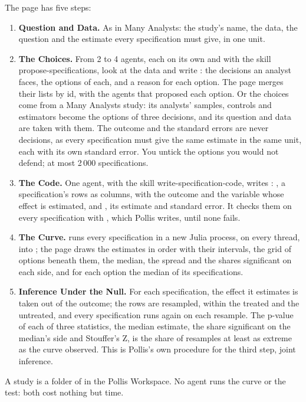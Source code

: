 The page has five steps:
\begin{enumerate}
  \item \textbf{Question and Data.} As in Many Analysts: the study's name, the data, the question and the
    estimate every specification must give, in one unit.
  \item \textbf{The Choices.} From 2 to 4 agents, each on its own and with the skill propose-specifications, look
    at the data and write : the decisions an analyst faces, the options of each, and a reason
    for each option. The page merges their lists by id, with the agents that proposed each option. Or the choices
    come from a Many Analysts study: its analysts' samples, controls and estimators become the options of three
    decisions, and its question and data are taken with them. The outcome and the standard errors are never
    decisions, as every specification must give the same estimate in the same unit, each with its own standard
    error. You untick the options you would not defend; at most 2\,000 specifications.
  \item \textbf{The Code.} One agent, with the skill write-specification-code, writes :
    , a specification's rows as columns, with the outcome  and the variable
     whose effect is estimated, and , its estimate and standard error. It checks
    them on every specification with , which Pollis writes, until none fails.
  \item \textbf{The Curve.}  runs every specification in a new Julia process, on every thread, into
    ; the page draws the estimates in order with their intervals, the grid of options beneath them,
    the median, the spread and the shares significant on each side, and for each option the median of its
    specifications.
  \item \textbf{Inference Under the Null.} For each specification, the effect it estimates is taken out of the
    outcome; the rows are resampled, within the treated and the untreated, and every specification runs again on
    each resample. The p-value of each of three statistics, the median estimate, the share significant on the
    median's side and Stouffer's Z, is the share of resamples at least as extreme as the curve observed. This is
    Pollis's own procedure for the third step, joint inference.
\end{enumerate}
A study is a folder of  in the Pollis Workspace. No agent runs the curve or
the test: both cost nothing but time.

